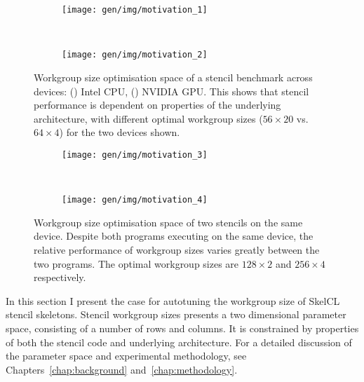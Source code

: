 \begin{figure}
\centering
\begin{subfigure}[h]{.49\textwidth}
\centering
\texttt{[image: gen/img/motivation\_1]}
\vspace{-1.5em} %
\caption{}
\label{fig:motivation-1}
\end{subfigure}
~%
\begin{subfigure}[h]{.49\textwidth}
\centering
\texttt{[image: gen/img/motivation\_2]}
\vspace{-1.5em} %
\caption{}
\label{fig:motivation-2}
\end{subfigure}
\caption{%
  Workgroup size optimisation space of a stencil benchmark across
  devices: () Intel CPU,
  () NVIDIA GPU. This shows that stencil
  performance is dependent on properties of the underlying
  architecture, with different optimal workgroup sizes ($56 \times 20$
  vs.\ $64 \times 4$) for the two devices shown.%
}
\label{fig:motivation-arch}
\end{figure}

\begin{figure}
\begin{subfigure}[h]{.49\textwidth}
\centering
\texttt{[image: gen/img/motivation\_3]}
\vspace{-1.5em} %
\caption{}
\label{fig:motivation-3}
\end{subfigure}
~%
\begin{subfigure}[h]{.49\textwidth}
\centering
\texttt{[image: gen/img/motivation\_4]}
\vspace{-1.5em} %
\caption{}
\label{fig:motivation-4}
\end{subfigure}
\caption{%
  Workgroup size optimisation space of two stencils on the same
  device. Despite both programs executing on the same device, the
  relative performance of workgroup sizes varies greatly between the
  two programs. The optimal workgroup sizes are $128\times2$ and
  $256\times4$ respectively.%
}
\label{fig:motivation-prog}
\end{figure}

In this section I present the case for autotuning the workgroup size
of SkelCL stencil skeletons. Stencil workgroup sizes presents a two
dimensional parameter space, consisting of a number of rows and
columns. It is constrained by properties of both the stencil code and
underlying architecture. For a detailed discussion of the parameter
space and experimental methodology, see Chapters~\ref{chap:background}
and~\ref{chap:methodology}.

